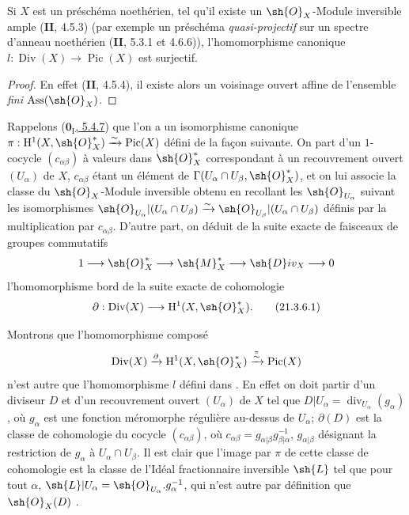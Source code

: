 \begin{corollary}[21.3.5]
\label{IV.21.3.5}
Si $X$ est un préschéma noethérien, tel qu'il existe un $\sh{O}_X$-Module inversible ample \textup{(\textbf{II}, 4.5.3)} \textup{(par exemple un préschéma \emph{quasi-projectif} sur un spectre d'anneau noethérien (\textbf{II}, 5.3.1 et 4.6.6))}, l'homomorphisme canonique $l:\operatorname{Div}(X)\to\operatorname{Pic}(X)$ est surjectif.
\end{corollary}

\begin{proof}
En effet (\textbf{II}, 4.5.4), il existe alors un voisinage ouvert affine de l'ensemble \emph{fini} $\operatorname{Ass}(\sh{O}_X)$.
\end{proof}

\begin{remark}[21.3.6]
\label{IV.21.3.6}
Rappelons (\hyperref[0.5.4.7]{$\mathbf{0}_{\mathrm I}$, 5.4.7}) que l'on a un isomorphisme canonique $\pi:\mathrm{H}^1(X,\sh{O}_X^*)\xrightarrow{\sim}\operatorname{Pic}(X)$ défini de la façon suivante.
On part d'un $1$-cocycle $(c_{\alpha\beta})$ à valeurs dans $\sh{O}_X^*$ correspondant à un recouvrement ouvert $(U_\alpha)$ de $X$, $c_{\alpha\beta}$ étant un élément de $\Gamma(U_\alpha\cap U_\beta,\sh{O}_X^*)$, et on lui associe la classe du $\sh{O}_X$-Module inversible obtenu en recollant les $\sh{O}_{U_\alpha}$ suivant les isomorphismes $\sh{O}_{U_\alpha}|(U_\alpha\cap U_\beta)\xrightarrow{\sim}\sh{O}_{U_\beta}|(U_\alpha\cap U_\beta)$ définis par la multiplication par $c_{\alpha\beta}$.
D'autre part, on déduit de la suite exacte de faisceaux de groupes commutatifs
\[
  1\to\sh{O}_X^*\to\sh{M}_X^*\to\sh{D}iv_X\to0
\]
l'homomorphisme bord de la suite exacte de cohomologie
\[
\label{IV.21.3.6.1}
  \partial:\operatorname{Div}(X)\to\mathrm{H}^1(X,\sh{O}_X^*).
  \tag{21.3.6.1}
\]

Montrons que l'homomorphisme composé
\[
  \operatorname{Div}(X)\xrightarrow{\partial}\mathrm{H}^1(X,\sh{O}_X^*)\xrightarrow{\overset{\pi}{\sim}}\operatorname{Pic}(X)
\]
n'est autre que l'homomorphisme $l$ défini dans .
En effet on doit partir d'un diviseur $D$ et d'un recouvrement ouvert $(U_\alpha)$ de $X$ tel que $D|U_\alpha=\operatorname{div}_{U_\alpha}(g_\alpha)$, où $g_\alpha$ est une fonction méromorphe régulière au-dessus de $U_\alpha$;
$\partial(D)$ est la classe de cohomologie du cocycle $(c_{\alpha\beta})$, où $c_{\alpha\beta}=g_{\alpha|\beta}g_{\beta|\alpha}^{-1}$, $g_{\alpha|\beta}$ désignant la restriction de $g_\alpha$ à $U_\alpha\cap U_\beta$.
Il est clair que l'image par $\pi$ de cette classe de cohomologie est la classe de l'Idéal fractionnaire inversible $\sh{L}$ tel que pour tout $\alpha$, $\sh{L}|U_\alpha=\sh{O}_{U_\alpha}.g_\alpha^{-1}$, qui n'est autre par définition que $\sh{O}_X(D)$ .
\end{remark}

